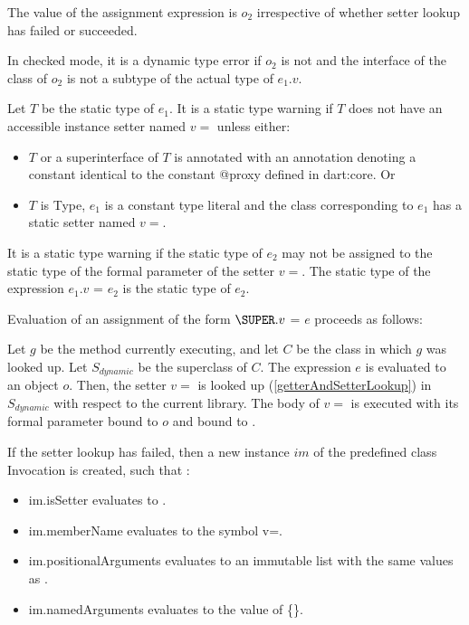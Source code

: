 \documentclass{article}
\newcommand{\code}[1]{{\sf #1}}
\begin{document}
\LMHash{}
The value of the assignment expression is $o_2$ irrespective of whether setter lookup has failed or succeeded.

\LMHash{}
In checked mode, it is a dynamic type error if $o_2$ is not \NULL{} and the interface of the class of $o_2$ is not a subtype of the actual type of $e_1.v$.

\LMHash{}
Let $T$ be the static type of $e_1$. It is a static type warning if $T$ does not have an accessible instance setter named $v=$ unless either:
\begin{itemize}
\item $T$ or a superinterface of $T$ is annotated with an annotation denoting a constant identical to the constant \code{@proxy} defined in \code{dart:core}. Or
\item $T$ is \code{Type}, $e_1$ is a constant type literal and the class corresponding to $e_1$ has a static setter named $v=$.
\end{itemize}



\LMHash{}
It is a static type warning if the static type of $e_2$ may not be assigned to the static type of the formal parameter of the setter $v=$.   The static type of the expression $e_1.v$ \code{=} $e_2$ is the static type of $e_2$.

\LMHash{}
Evaluation of an assignment of the form $\SUPER.v$ \code{=} $e$ proceeds as follows:

\LMHash{}
Let $g$ be the method currently executing, and let $C$ be the class in which $g$ was looked up.  Let $S_{dynamic}$ be the superclass of $C$.
The expression $e$ is evaluated to an object $o$.  Then, the setter $v=$ is looked up (\ref{getterAndSetterLookup}) in $S_{dynamic}$ with respect to the current library.  The body  of $v=$ is executed with its formal parameter bound to $o$ and \THIS{} bound to \THIS{}.

\LMHash{}
If the setter lookup has failed, then a new instance $im$  of the predefined class  \code{Invocation}  is created, such that :
\begin{itemize}
\item  \code{im.isSetter} evaluates to \code{\TRUE{}}.
\item  \code{im.memberName} evaluates to the symbol \code{v=}.
\item \code{im.positionalArguments} evaluates to an immutable list with the same values as \code{[$o$]}.
\item \code{im.namedArguments} evaluates to the value of \code{\CONST{} \{\}}.
\end{itemize}
\end{document}
